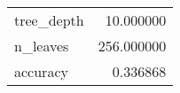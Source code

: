 \begin{tabular}{lr}
\toprule
 &  \\
\midrule
tree\_depth & 10.000000 \\
n\_leaves & 256.000000 \\
accuracy & 0.336868 \\
\bottomrule
\end{tabular}